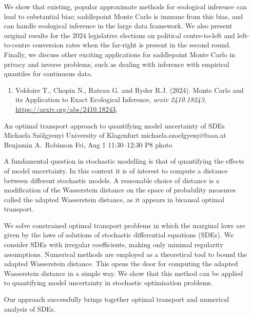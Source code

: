 \documentclass[12pt,lettersize,oneside]{book} %
\begin{document}
\begin{talk}
We show that existing, popular approximate methods for ecological inference can
lead to substantial bias; saddlepoint Monte Carlo is immune from this bias, and 
can handle ecological inference in the large data framework. We also
present original results for the 2024 legislative elections on political
centre-to-left and left-to-centre conversion rates when the far-right is
present in the second round. Finally, we discuss other exciting applications
for saddlepoint Monte Carlo in privacy and inverse problems, such as dealing
with inference with empirical quantiles for continuous data.

\medskip

\begin{enumerate}
 \item[{[1]}] 
      Voldoire T., Chopin N., Rateau G. and Ryder R.J. (2024).
      Monte Carlo and its Application to Exact Ecological Inference, 
      \textit{arxiv 2410.18243},
      \url{https://arxiv.org/abs/2410.18243}, 
\end{enumerate}
\vspace{-10ex}
\end{talk}

\clearpage
\begin{talk}
  {An optimal transport approach to quantifying model uncertainty of SDEs}%
  {Michaela Sz\"olgyenyi}%
  {University of Klagenfurt}%
  {michaela.szoelgyenyi@aau.at}%
  {Benjamin A.~Robinson}%
  {}%
  {Fri, Aug 1 11:30--12:30}%
  {P8}%
  {photo}%
  
    
   
A fundamental question in stochastic modelling is that of quantifying the effects of model uncertainty. In this context it is of interest to compute a distance between different stochastic models. A  reasonable choice of distance is a modification of the Wasserstein distance on the space of probability measures called the adapted Wasserstein distance, as it appears in bicausal optimal transport.

 We solve constrained optimal transport problems in which the marginal laws are given by the laws of solutions of stochastic differential equations (SDEs). We consider SDEs with irregular coefficients, making only minimal regularity assumptions. Numerical methods are employed as a theoretical tool to bound the adapted Wasserstein distance. This opens the door for computing the adapted Wasserstein distance in a simple way. We show that this method can be applied to quantifying model uncertainty in stochastic optimisation problems.  
 
 Our approach successfully brings together optimal transport and numerical analysis of SDEs. 
\end{talk}
\end{document}

